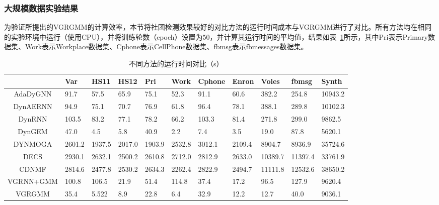 \subsubsection{大规模数据实验结果}
为验证所提出的VGRGMM的计算效率，本节将社团检测效果较好的对比方法的运行时间成本与VGRGMM进行了对比。所有方法均在相同的实验环境中运行（使用CPU），并将训练轮数（epoch）设置为$50$，并计算其运行时间的平均值，结果如表~\ref{tab2}所示，其中Pri表示Primary数据集、Work表示Workplace数据集、Cphone表示CellPhone数据集、fbmsg表示fbmessages数据集。
\begin{table}[!htbp]
	\centering
		\caption{\label{tab2}不同方法的运行时间对比（s）}
		\vspace{0.5em}\centering\wuhao
		\begin{tabular}{cp{0.6cm}p{0.7cm}p{0.7cm}p{0.7cm}p{0.7cm}p{0.7cm}p{0.7cm}p{0.85cm}p{0.85cm}p{0.7cm}}
			\toprule[1.5pt]
			\diagbox{方法名}{数据集}& Var & HS11 & HS12 & Pri & Work & Cphone & Enron & Voles & fbmsg & Synth \\
			\midrule[1.0pt]
			AdaDyGNN & 91.7 & 57.5 & 65.9 & 75.1 & 52.3 & 91.1 & 60.6 & 382.2  & 254.8 & 10943.2\\
			
			DynAERNN & 94.9 & 75.1 & 70.7 & 76.9 & 61.8 & 96.4 & 78.1 & 388.1 & 289.8 & 10102.3\\
			
			DynRNN & 103.5 & 83.2 & 77.1 & 78.2 & 66.2 &103.3 & 81.4 &271.8 & 299.0 & 9862.5\\
			
			DynGEM & 47.0 & 4.5 & 5.8 & 40.9 & 2.2  & 7.4 &   3.5 & 19.0 & 87.8 & 5620.1 \\
			
			DYNMOGA & 2601.2& 1937.5 & 2017.0 & 1903.9 & 2532.8 & 3012.1 & 2109.4 & 8904.7 & 8936.9 & 35724.6\\
			
			DECS & 2930.1 & 2632.1 & 2500.2 & 2610.8 & 2712.0 & 2812.9 &  2633.0 & 10389.7 & 11397.4 & 33761.9\\
			
			CDNMF & 2814.6 & 2477.8 & 2530.2 & 2634.3 & 2262.4 &2822.9 & 2494.7 & 11111.8 & 12532.6 & 38650.2\\
			
			VGRNN+GMM & 100.8 & 106.5 & 21.9 & 51.4 & 114.8 & 37.4 &  17.2 & 96.5 & 127.9 & 9620.4\\
			
			VGRGMM & 35.4 & 5.522 & 8.9 & 22.8 & 6.4& 32.9 &  12.2 & 12.7 & 40.0 & 9036.1\\
			\bottomrule[1.5pt]
		\end{tabular} 
		
\end{table}



